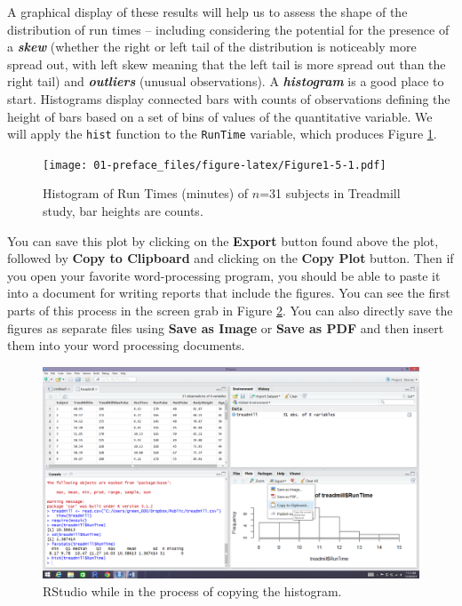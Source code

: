 \documentclass[]{book}
\newenvironment{Shaded}{\begin{snugshade}}{\end{snugshade}}
\newcommand{\KeywordTok}[1]{\textcolor[rgb]{0.13,0.29,0.53}{\textbf{#1}}}
\newcommand{\NormalTok}[1]{#1}
\newcommand{\OperatorTok}[1]{\textcolor[rgb]{0.81,0.36,0.00}{\textbf{#1}}}
\newcommand{\StringTok}[1]{\textcolor[rgb]{0.31,0.60,0.02}{#1}}
\renewcommand{\indent}{\hspace{15pt}}
\renewenvironment{Shaded}{%
\setlength{\FrameRule}{1.5pt}
\def\FrameCommand{\fboxrule=\FrameRule\fboxsep=5pt 
                  \fcolorbox{framecolor}{shadecolor}}%
\MakeFramed {\FrameRestore}}%
{\endMakeFramed}
\begin{document}
\indent A graphical display of these results will help us to assess the shape
of the distribution of run times -- including considering the potential for the presence of a \textbf{\emph{skew}} (whether the right or left tail of the distribution
is noticeably more spread out, with left skew meaning that the left tail
is more spread out than the right tail)  and \textbf{\emph{outliers}} 
(unusual observations). A \textbf{\emph{histogram}}  is a good place to start.
Histograms display connected bars with counts of observations defining
the height of bars based on a set of bins of values of the quantitative variable.
We will apply the \texttt{hist} function to the \texttt{RunTime} variable, which produces
Figure \ref{fig:Figure1-5}.

\begin{Shaded}
\end{Shaded}



\begin{figure}
\centering
\texttt{[image: 01-preface\_files/figure-latex/Figure1-5-1.pdf]}
\caption{\label{fig:Figure1-5}Histogram of Run Times (minutes) of \(n\)=31 subjects in Treadmill study, bar heights are counts.}
\end{figure}

\indent You can save this plot by clicking on the \textbf{Export} button found above
the plot, followed by \textbf{Copy to Clipboard} and clicking on the
\textbf{Copy Plot} button. Then if you open your
favorite word-processing program, you should be able to paste it into a
document for writing reports that include the figures. You can see the first
parts of this process in the screen grab in Figure \ref{fig:Figure1-6}. You can also directly save the figures as separate files using
\textbf{Save as Image} or \textbf{Save as PDF} and then insert them into your word
processing documents.



\begin{figure}[ht]
\includegraphics[width=26.67in]{chapter1_files/image010} \caption{RStudio while in the process of copying the histogram.}\label{fig:Figure1-6}
\end{figure}
\end{document}

